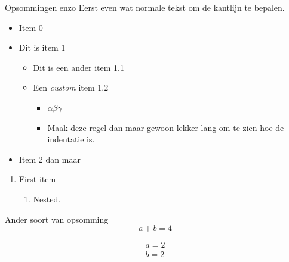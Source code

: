 \documentclass[department=none, notes={show notes}, slidesperpage=4, official=true, handout]{beamerruhuisstijl}
\begin{document}
\begin{frame}{Opsommingen enzo}
    Eerst even wat normale tekst om de kantlijn te bepalen.
    \begin{itemize}
        \item[$\star$] Item 0
        \item Dit is item 1
        \begin{itemize}
            \item Dit is een ander item 1.1
            \item[$\Gamma$] Een \emph{custom} item 1.2
            \begin{itemize}
                \item $\alpha \beta \gamma$
                \item Maak deze regel dan maar gewoon lekker lang om te zien hoe de indentatie is.
            \end{itemize}
        \end{itemize}
        \item Item 2 dan maar
    \end{itemize}

    \begin{enumerate}
        \item First item
        \begin{enumerate}
            \item Nested.
        \end{enumerate}
    \end{enumerate}
\end{frame}

\begin{frame}{Ander soort van opsomming}
\[ a+b=4 \]

\begin{equation}
    \begin{split}
        a = 2 \\
        b = 2
    \end{split}
\end{equation}

\end{frame}
\note{}
\end{document}

